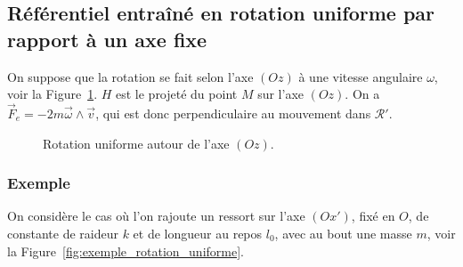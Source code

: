     \subsection[Référentiel entraîné en rotation uniforme]{Référentiel entraîné en rotation uniforme par\\rapport à un axe fixe}

        On suppose que la rotation se fait selon l'axe $(Oz)$ à une vitesse angulaire $\omega$, voir la Figure~\ref{fig:rotation_uniforme}. $H$ est le projeté du point $M$ sur l'axe $(Oz)$. On a $\vec{F}_e=-2m\vec{\omega}\wedge\vec{v}$, qui est donc perpendiculaire au mouvement dans $\mathcal{R}'$.

        \begin{figure}
            \centering
            \caption{Rotation uniforme autour de l'axe $(Oz)$.}    
            \label{fig:rotation_uniforme}
        \end{figure}

        \subsubsection{Exemple}

            On considère le cas où l'on rajoute un ressort sur l'axe $(Ox')$, fixé en $O$, de constante de raideur $k$ et de longueur au repos $l_0$, avec au bout une masse $m$, voir la Figure~\ref{fig:exemple_rotation_uniforme}.           

